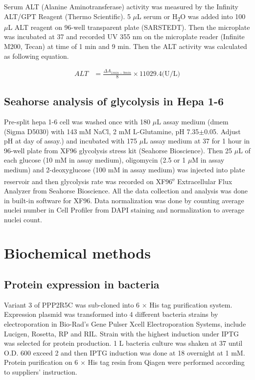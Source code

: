 Serum ALT (Alanine Aminotransferase) activity was measured by the Infinity ALT/GPT Reagent (Thermo Scientific). 5 $\mu$L serum or H\textsubscript{2}O was added into 100 $\mu$L ALT reagent on 96-well transparent plate (SARSTEDT). Then the microplate was incubated at 37 \celsius{} and recorded UV 355 nm on the microplate reader (Infinite\textsuperscript{\textregistered} M200, Tecan) at time of 1 min and 9 min. Then the ALT activity was calculated as following equation.

\begin{align*}
ALT & = \frac {\Delta A_{1 min - 9 min}}{8} \times 11029.4 \text{(U/L)}
\end{align*}

\subsection{Seahorse analysis of glycolysis in Hepa 1-6}

Pre-split hepa 1-6 cell was washed once with 180 $\mu$L assay medium (\gls{dmem} (Sigma D5030) with 143 mM NaCl, 2 mM L-Glutamine, pH 7.35$\pm$0.05. Adjust pH at day of assay.) and incubated with 175 $\mu$L assay medium at 37 \celsius{} for 1 hour in 96-well plate from XF96 glycolysis stress kit (Seahorse Bioscience). Then 25 $\mu$L of each glucose (10 mM in assay medium), oligomycin (2.5 or 1 $\mu$M in assay medium) and 2-deoxyglucose (100 mM in assay medium) was injected into plate reservoir and then glycolysis rate was recorded on XF96\textsuperscript{e} Extracellular Flux Analyzer from Seahorse Bioscience. All the data collection and analysis was done in built-in software for XF96. Data normalization was done by counting average nuclei number in Cell Profiler from DAPI staining and normalization to average nuclei count. 

\section{Biochemical methods}

\subsection{Protein expression in bacteria}

Variant 3 of PPP2R5C was sub-cloned into 6 $\times$ His tag purification system. Expression plasmid was transformed into 4 different bacteria strains by electroporation in Bio-Rad's Gene Pulser Xcell\textsuperscript{\texttrademark} Electroporation Systems, include Lucigen, Rosetta, RP and RIL. Strain with the highest induction under IPTG was selected for protein production. 1 L bacteria culture was shaken at 37 \celsius{} until O.D. 600 exceed 2 and then IPTG induction was done at 18 \celsius{} overnight at 1 mM. Protein purification on 6 $\times$ His tag resin from Qiagen were performed according to suppliers' instruction.

